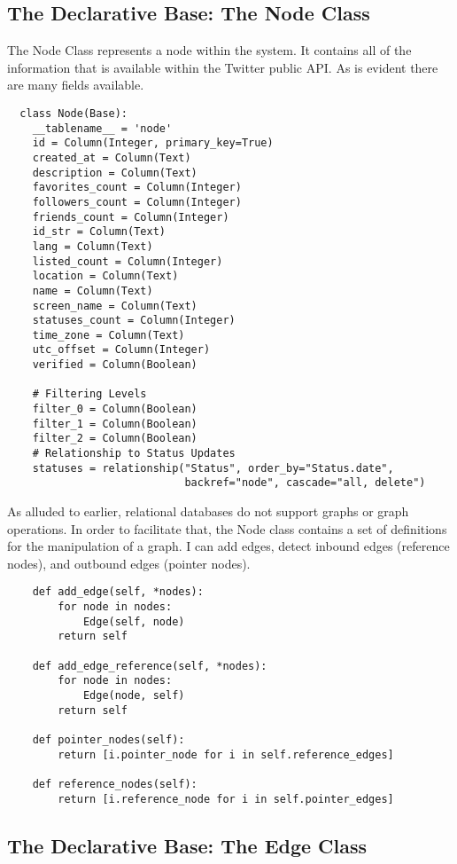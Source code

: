 \subsection{The Declarative Base: The Node Class}
The Node Class represents a node within the system. It contains all of the information that is available within the Twitter public API. As is evident there are many fields available.
\begin{lstlisting}
  class Node(Base):
    __tablename__ = 'node'
    id = Column(Integer, primary_key=True)
    created_at = Column(Text)
    description = Column(Text)
    favorites_count = Column(Integer)
    followers_count = Column(Integer)
    friends_count = Column(Integer)
    id_str = Column(Text)
    lang = Column(Text)
    listed_count = Column(Integer)
    location = Column(Text)
    name = Column(Text)
    screen_name = Column(Text)
    statuses_count = Column(Integer)
    time_zone = Column(Text)
    utc_offset = Column(Integer)
    verified = Column(Boolean)

    # Filtering Levels
    filter_0 = Column(Boolean)
    filter_1 = Column(Boolean)
    filter_2 = Column(Boolean)
    # Relationship to Status Updates
    statuses = relationship("Status", order_by="Status.date",
                            backref="node", cascade="all, delete")
\end{lstlisting}

As alluded to earlier, relational databases do not support graphs or graph operations. In order to facilitate that, the Node class contains a set of definitions for the manipulation of a graph. I can add edges, detect inbound edges (reference nodes), and outbound edges (pointer nodes).

\begin{lstlisting}
    def add_edge(self, *nodes):
        for node in nodes:
            Edge(self, node)
        return self

    def add_edge_reference(self, *nodes):
        for node in nodes:
            Edge(node, self)
        return self

    def pointer_nodes(self):
        return [i.pointer_node for i in self.reference_edges]

    def reference_nodes(self):
        return [i.reference_node for i in self.pointer_edges]
\end{lstlisting}

\subsection{The Declarative Base: The Edge Class}

